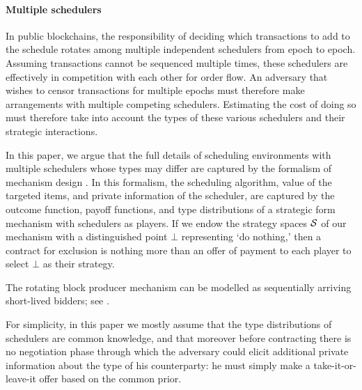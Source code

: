 \paragraph{Multiple schedulers}
%
In public blockchains, the responsibility of deciding which transactions to add to the schedule rotates among multiple independent schedulers from epoch to epoch.
%
Assuming transactions cannot be sequenced multiple times, these schedulers are effectively in competition with each other for order flow.
%
An adversary that wishes to censor transactions for multiple epochs must therefore make arrangements with multiple competing schedulers.
%
Estimating the cost of doing so must therefore take into account the types of these various schedulers and their strategic interactions.

In this paper, we argue that the full details of scheduling environments with multiple schedulers whose types may differ are captured by the formalism of mechanism design \cite{milgrom2004putting}.
%
In this formalism, the scheduling algorithm, value of the targeted items, and private information of the scheduler, are captured by the outcome function, payoff functions, and type distributions of a strategic form mechanism with schedulers as players.
%
If we endow the strategy spaces $\mathcal{S}$ of our mechanism with a distinguished point $\bot$ representing `do nothing,' then a contract for exclusion is nothing more than an offer of payment to each player to select $\bot$ as their strategy.

\begin{example}

  The rotating block producer mechanism can be modelled as sequentially arriving short-lived bidders; see \cite[Chap.~2]{gershkov2014dynamic}.

\end{example}

\begin{remark}[Negotiation]

  For simplicity, in this paper we mostly assume that the type distributions of schedulers are common knowledge, and that moreover before contracting there is no negotiation phase through which the adversary could elicit additional private information about the type of his counterparty: he must simply make a take-it-or-leave-it offer based on the common prior.

\end{remark}


